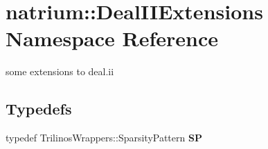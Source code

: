 \hypertarget{namespacenatrium_1_1DealIIExtensions}{
\section{natrium::DealIIExtensions Namespace Reference}
\label{namespacenatrium_1_1DealIIExtensions}
}


some extensions to deal.ii  
\subsection*{Typedefs}
\begin{DoxyCompactItemize}
\item 
\hypertarget{namespacenatrium_1_1DealIIExtensions_ae3b719f221dd5d719bd58896660e6525}{
typedef TrilinosWrappers::SparsityPattern {\bfseries SP}}
\label{namespacenatrium_1_1DealIIExtensions_ae3b719f221dd5d719bd58896660e6525}

\end{DoxyCompactItemize}
